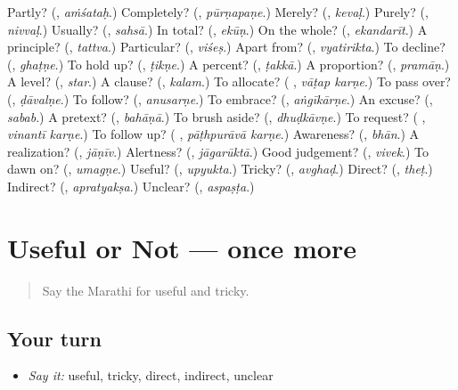 \begin{tcolorbox}[breakable,colback=teal!4,colframe=teal!35!black,title={Before you move on}]
Partly? (\textbf{}, \emph{aṁśataḥ}.) Completely? (\textbf{}, \emph{pūrṇapaṇe}.) Merely? (\textbf{}, \emph{kevaḷ}.) Purely? (\textbf{}, \emph{nivvaḷ}.) Usually? (\textbf{}, \emph{sahsā}.) In total? (\textbf{}, \emph{ekūṇ}.) On the whole? (\textbf{}, \emph{ekandarīt}.) A principle? (\textbf{}, \emph{tattva}.) Particular? (\textbf{}, \emph{viśeṣ}.) Apart from? (\textbf{}, \emph{vyatirikta}.) To decline? (\textbf{}, \emph{ghaṭṇe}.) To hold up? (\textbf{}, \emph{ṭikṇe}.) A percent? (\textbf{}, \emph{ṭakkā}.) A proportion? (\textbf{}, \emph{pramāṇ}.) A level? (\textbf{}, \emph{star}.) A clause? (\textbf{}, \emph{kalam}.) To allocate? (\textbf{ }, \emph{vāṭap karṇe}.) To pass over? (\textbf{}, \emph{ḍāvalṇe}.) To follow? (\textbf{}, \emph{anusarṇe}.) To embrace? (\textbf{}, \emph{aṅgīkārṇe}.) An excuse? (\textbf{}, \emph{sabab}.) A pretext? (\textbf{}, \emph{bahāṇā}.) To brush aside? (\textbf{}, \emph{dhuḍkāvṇe}.) To request? (\textbf{ }, \emph{vinantī karṇe}.) To follow up? (\textbf{ }, \emph{pāṭhpurāvā karṇe}.) Awareness? (\textbf{}, \emph{bhān}.) A realization? (\textbf{}, \emph{jāṇīv}.) Alertness? (\textbf{}, \emph{jāgarūktā}.) Good judgement? (\textbf{}, \emph{vivek}.) To dawn on? (\textbf{}, \emph{umagṇe}.) Useful? (\textbf{}, \emph{upyukta}.) Tricky? (\textbf{}, \emph{avghaḍ}.) Direct? (\textbf{}, \emph{theṭ}.) Indirect? (\textbf{}, \emph{apratyakṣa}.) Unclear? (\textbf{}, \emph{aspaṣṭa}.)
\end{tcolorbox}
\section[(dialogue)]{Useful or Not — once more}

\label{lesson:MR-R395-review-final-395}



\begin{quote}
Say the Marathi for useful and tricky.
\end{quote}

\subsection*{Your turn}
\begin{itemize}
\raggedright
  \item \emph{Say it:} useful, tricky, direct, indirect, unclear
\end{itemize}

